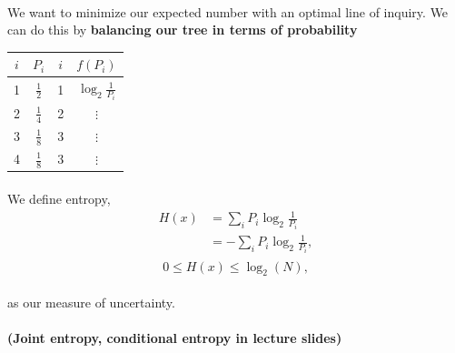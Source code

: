 \documentclass[letterpaper,12pt]{article}
\begin{document}
\paragraph{}We want to minimize our expected number with an optimal line of inquiry. We can
do this by \textbf{balancing our tree in terms of probability}
\begin{table}[H]
    \centering
    \begin{tabular}{| c | c | c | c |}
        \hline
        $i$ & $P_i$ & $i$ & $f(P_i)$\\
        \hline
        1 & $\frac{1}{2}$ & 1 & $\log_2 \frac{1}{P_i}$\\
        2 & $\frac{1}{4}$ & 2 & $\vdots$\\
        3 & $\frac{1}{8}$ & 3 & $\vdots$\\
        4 & $\frac{1}{8}$ & 3 & $\vdots$\\
        \hline
    \end{tabular}
\end{table}
\paragraph{}We define entropy,
\begin{align*}
    H(x) &= \sum_i P_i \log_2 \frac{1}{P_i}\\
         &= -\sum_i P_i \log_2 \frac{1}{P_i},\\
\end{align*}
\[
    0 \le H(x) \le \log_2(N),
\]
\paragraph{}as our measure of uncertainty.
\paragraph{(Joint entropy, conditional entropy in lecture slides)}
\end{document}
